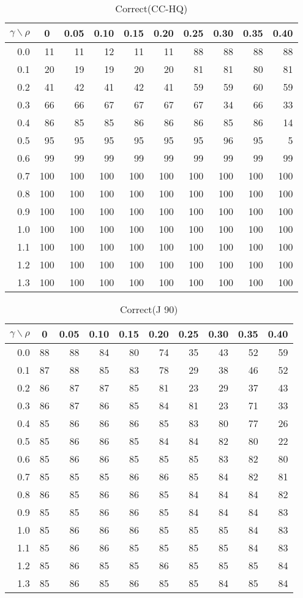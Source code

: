 \documentclass[12pt]{article}
\begin{document}
%
\begin{table}[!tbp]
\caption{Correct(CC-HQ)}
 \begin{center}
 \begin{tabular}{r|rrrrrrrrr}\hline\hline
\multicolumn{1}{c|}{$\gamma\backslash\rho$}&\multicolumn{1}{c}{0}&\multicolumn{1}{c}{0.05}&\multicolumn{1}{c}{0.10}&\multicolumn{1}{c}{0.15}&\multicolumn{1}{c}{0.20}&\multicolumn{1}{c}{0.25}&\multicolumn{1}{c}{0.30}&\multicolumn{1}{c}{0.35}&\multicolumn{1}{c}{0.40}\tabularnewline
\hline
0.0& 11& 11& 12& 11& 11& 88& 88& 88& 88\tabularnewline
0.1& 20& 19& 19& 20& 20& 81& 81& 80& 81\tabularnewline
0.2& 41& 42& 41& 42& 41& 59& 59& 60& 59\tabularnewline
0.3& 66& 66& 67& 67& 67& 67& 34& 66& 33\tabularnewline
0.4& 86& 85& 85& 86& 86& 86& 85& 86& 14\tabularnewline
0.5& 95& 95& 95& 95& 95& 95& 96& 95&  5\tabularnewline
0.6& 99& 99& 99& 99& 99& 99& 99& 99& 99\tabularnewline
0.7&100&100&100&100&100&100&100&100&100\tabularnewline
0.8&100&100&100&100&100&100&100&100&100\tabularnewline
0.9&100&100&100&100&100&100&100&100&100\tabularnewline
1.0&100&100&100&100&100&100&100&100&100\tabularnewline
1.1&100&100&100&100&100&100&100&100&100\tabularnewline
1.2&100&100&100&100&100&100&100&100&100\tabularnewline
1.3&100&100&100&100&100&100&100&100&100\tabularnewline
\hline
\end{tabular}

\end{center}

\end{table}

%
\begin{table}[!tbp]
\caption{Correct(J 90)}
 \begin{center}
 \begin{tabular}{r|rrrrrrrrr}\hline\hline
\multicolumn{1}{c|}{$\gamma\backslash\rho$}&\multicolumn{1}{c}{0}&\multicolumn{1}{c}{0.05}&\multicolumn{1}{c}{0.10}&\multicolumn{1}{c}{0.15}&\multicolumn{1}{c}{0.20}&\multicolumn{1}{c}{0.25}&\multicolumn{1}{c}{0.30}&\multicolumn{1}{c}{0.35}&\multicolumn{1}{c}{0.40}\tabularnewline
\hline
0.0&88&88&84&80&74&35&43&52&59\tabularnewline
0.1&87&88&85&83&78&29&38&46&52\tabularnewline
0.2&86&87&87&85&81&23&29&37&43\tabularnewline
0.3&86&87&86&85&84&81&23&71&33\tabularnewline
0.4&85&86&86&86&85&83&80&77&26\tabularnewline
0.5&85&86&86&85&84&84&82&80&22\tabularnewline
0.6&85&86&86&85&85&85&83&82&80\tabularnewline
0.7&85&85&85&86&86&85&84&82&81\tabularnewline
0.8&86&85&86&86&85&84&84&84&82\tabularnewline
0.9&85&85&86&86&85&84&84&84&83\tabularnewline
1.0&85&86&86&86&85&85&85&84&83\tabularnewline
1.1&85&86&86&85&85&85&85&84&83\tabularnewline
1.2&85&86&85&85&86&85&85&85&84\tabularnewline
1.3&85&86&85&86&85&85&84&85&84\tabularnewline
\hline
\end{tabular}

\end{center}

\end{table}
\end{document}
